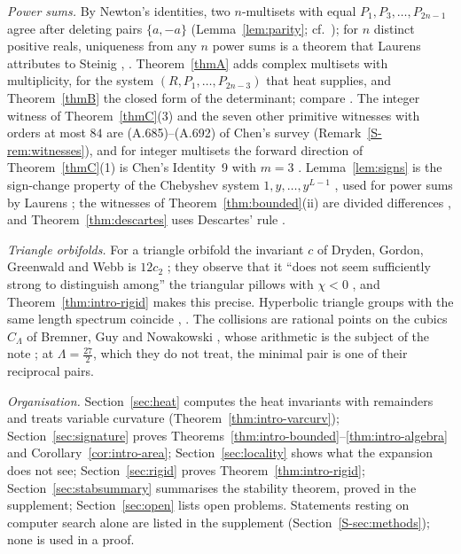 \documentclass[pdflatex,sn-mathphys-num]{sn-jnl}
\theoremstyle{thmstyleone}%
\theoremstyle{thmstylethree}%
\newcommand{\sref}[1]{\ref*{S-#1}}%
\begin{document}
\emph{Power sums.} By Newton's identities, two $n$-multisets with equal $P_1,P_3,\dots,P_{2n-1}$ agree after deleting pairs $\{a,-a\}$ (Lemma~\ref{lem:parity}; cf.\ \cite[\S3]{borweiningalls1994}); for $n$ distinct positive reals, uniqueness from any $n$ power sums is a theorem that Laurens attributes to Steinig \cite[after the statement of Lemma~3.2]{laurens2023}, \cite[Prop.~24]{msw2022}. Theorem~\ref{thmA} adds complex multisets with multiplicity, for the system $(R,P_1,\dots,P_{2n-3})$ that heat supplies, and Theorem~\ref{thmB} the closed form of the determinant; compare \cite[\S3]{korobovbugaevskaya2016}. The integer witness of Theorem~\ref{thmC}(3) and the seven other primitive witnesses with orders at most $84$ are (A.685)--(A.692) of Chen's survey \cite[\S A.5.8]{chen2025survey} (Remark~\sref{rem:witnesses}), and for integer multisets the forward direction of Theorem~\ref{thmC}(1) is Chen's Identity~9 with $m=3$ \cite[(3.27)--(3.28)]{chen2025survey}. Lemma~\ref{lem:signs} is the sign-change property of the Chebyshev system $1,y,\dots,y^{L-1}$ \cite{karlinstudden1966}, used for power sums by Laurens \cite{laurens2023}; the witnesses of Theorem~\ref{thm:bounded}(ii) are divided differences \cite{deboor2005}, and Theorem~\ref{thm:descartes} uses Descartes' rule \cite[Part~V]{polyaszego1998}.

\emph{Triangle orbifolds.} For a triangle orbifold the invariant $c$ of Dryden, Gordon, Greenwald and Webb is $12c_2$ \cite[(5.13)]{dggw2008}; they observe that it ``does not seem sufficiently strong to distinguish among'' the triangular pillows with $\chi<0$ \cite[Rem.~5.16]{dggw2008}, and Theorem~\ref{thm:intro-rigid} makes this precise. Hyperbolic triangle groups with the same length spectrum coincide \cite{philippe2010gd}, \cite[Thm~3.1]{philippe2010tsg}. The collisions are rational points on the cubics $C_\Lambda$ of Bremner, Guy and Nowakowski \cite[p.~117]{bgn1993}, whose arithmetic is the subject of the note \cite{companion}; at $\Lambda=\frac{27}2$, which they do not treat, the minimal pair is one of their reciprocal pairs.

\emph{Organisation.} Section~\ref{sec:heat} computes the heat invariants with remainders and treats variable curvature (Theorem~\ref{thm:intro-varcurv}); Section~\ref{sec:signature} proves Theorems~\ref{thm:intro-bounded}--\ref{thm:intro-algebra} and Corollary~\ref{cor:intro-area}; Section~\ref{sec:locality} shows what the expansion does not see; Section~\ref{sec:rigid} proves Theorem~\ref{thm:intro-rigid}; Section~\ref{sec:stabsummary} summarises the stability theorem, proved in the supplement; Section~\ref{sec:open} lists open problems. Statements resting on computer search alone are listed in the supplement (Section~\sref{sec:methods}); none is used in a proof.
\end{document}
